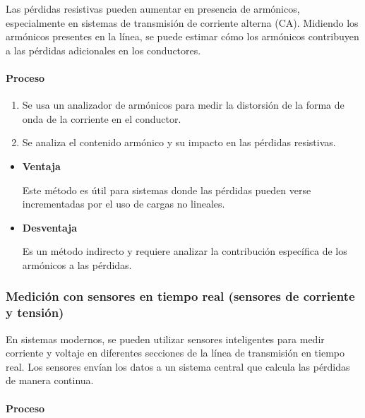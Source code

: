             Las pérdidas resistivas pueden aumentar en presencia de armónicos, especialmente en sistemas de transmisión de corriente alterna (CA). Midiendo los armónicos presentes en la línea, se puede estimar cómo los armónicos contribuyen a las pérdidas adicionales en los conductores.

            \paragraph{Proceso}

                \begin{enumerate}
                    \item Se usa un analizador de armónicos para medir la distorsión de la forma de onda de la corriente en el conductor.
                    
                    \item Se analiza el contenido armónico y su impacto en las pérdidas resistivas.
                \end{enumerate}

            \begin{itemize}
                \item \textbf{Ventaja}

                    Este método es útil para sistemas donde las pérdidas pueden verse incrementadas por el uso de cargas no lineales.
                    
                \item \textbf{Desventaja}

                     Es un método indirecto y requiere analizar la contribución específica de los armónicos a las pérdidas.
            \end{itemize}

        \subsubsection{Medición con sensores en tiempo real (sensores de corriente y tensión)}

            En sistemas modernos, se pueden utilizar sensores inteligentes para medir corriente y voltaje en diferentes secciones de la línea de transmisión en tiempo real. Los sensores envían los datos a un sistema central que calcula las pérdidas de manera continua.

            \paragraph{Proceso}

